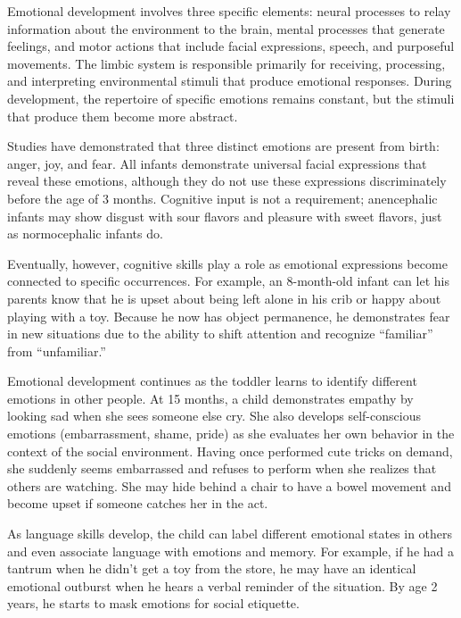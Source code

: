 Emotional development involves three specific elements: neural processes to
relay information about the environment to the brain, mental processes that
generate feelings, and motor actions that include facial expressions, speech,
and purposeful movements. The limbic system is responsible primarily for
receiving, processing, and interpreting environmental stimuli that produce
emotional responses. During development, the repertoire of specific emotions
remains constant, but the stimuli that produce them become more abstract.
\cite{Gerber2011}

Studies have demonstrated that three distinct emotions are present from birth:
anger, joy, and fear. All infants demonstrate universal facial expressions that
reveal these emotions, although they do not use these expressions
discriminately before the age of 3 months. Cognitive input is not a
requirement; anencephalic infants may show disgust with sour flavors and
pleasure with sweet flavors, just as normocephalic infants do.
\cite{Gerber2011}

Eventually, however, cognitive skills play a role as emotional expressions
become connected to specific occurrences. For example, an 8-month-old infant
can let his parents know that he is upset about being left alone in his crib or
happy about playing with a toy. Because he now has object permanence, he
demonstrates fear in new situations due to the ability to shift attention and
recognize “familiar” from “unfamiliar.” \cite{Gerber2011}

Emotional development continues as the toddler learns to identify different
emotions in other people. At 15 months, a child demonstrates empathy by looking
sad when she sees someone else cry. She also develops self-conscious emotions
(embarrassment, shame, pride) as she evaluates her own behavior in the context
of the social environment. Having once performed cute tricks on demand, she
suddenly seems embarrassed and refuses to perform when she realizes that others
are watching. She may hide behind a chair to have a bowel movement and become
upset if someone catches her in the act. \cite{Gerber2011}

As language skills develop, the child can label different emotional states in
others and even associate language with emotions and memory. For example, if he
had a tantrum when he didn’t get a toy from the store, he may have an identical
emotional outburst when he hears a verbal reminder of the situation. By age 2
years, he starts to mask emotions for social etiquette. \cite{Gerber2011}


